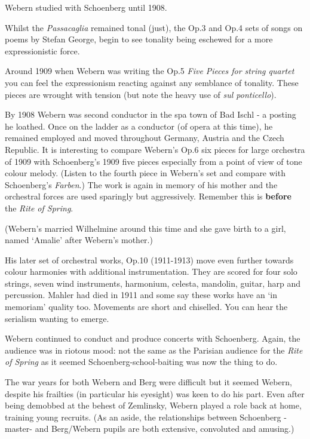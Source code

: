 Webern studied with Schoenberg until 1908.

Whilst the \textit{Passacaglia} remained tonal (just), the Op.3 and Op.4 sets of songs on poems by Stefan George, begin to see tonality being eschewed for a more expressionistic force. 

Around 1909 when Webern was writing the Op.5 \textit{Five Pieces for string quartet} you can feel the expressionism reacting against any semblance of tonality. These pieces are wrought with tension (but note the heavy use of \textit{sul ponticello}). 

By 1908 Webern was second conductor in the spa town of Bad Ischl - a posting he loathed. Once on the ladder as a conductor (of opera at this time), he remained employed and moved throughout Germany, Austria and the Czech Republic. It is interesting to compare Webern's Op.6 six pieces for large orchestra of 1909 with Schoenberg's 1909 five pieces especially from a point of view of tone colour melody. (Listen to the fourth piece in Webern's set and compare with Schoenberg's \textit{Farben}.) The work is again in memory of his mother and the orchestral forces are used sparingly but aggressively. Remember this is \textbf{before} the \textit{Rite of Spring}.

(Webern's married Wilhelmine around this time and she gave birth to a girl, named `Amalie' after Webern's mother.)

His later set of orchestral works, Op.10 (1911-1913) move even further towards colour harmonies with additional instrumentation. They are scored for four solo strings, seven wind instruments, harmonium, celesta, mandolin, guitar, harp and percussion. Mahler had died in 1911 and some say these works have an `in memoriam' quality too. Movements are short and chiselled. You can hear the serialism wanting to emerge. 

Webern continued to conduct and produce concerts with Schoenberg. Again, the audience was in riotous mood: not the same as the Parisian audience for the \textit{Rite of Spring} as it seemed Schoenberg-school-baiting was now the thing to do. 

The war years for both Webern and Berg were difficult but it seemed Webern, despite his frailties (in particular his eyesight) was keen to do his part. Even after being demobbed at the behest of Zemlinsky, Webern played a role back at home, training young recruits. (As an aside, the relationships between Schoenberg - master- and Berg/Webern pupils are both extensive, convoluted and amusing.)

